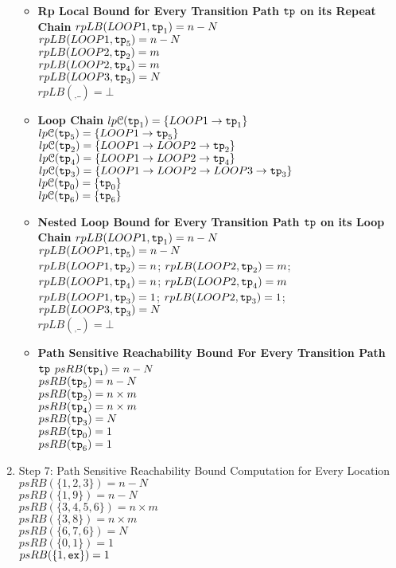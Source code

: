 \begin{enumerate}
\begin{itemize}
    \item \textbf{Rp Local Bound for Every Transition Path $\mathtt{tp}$ on its Repeat Chain}
    $rpLB(LOOP1, \mathtt{tp}_1) = n - N$ \\
    $rpLB(LOOP1, \mathtt{tp}_5) = n - N$ \\
    $rpLB(LOOP2, \mathtt{tp}_2) = m$ \\
    $rpLB(LOOP2, \mathtt{tp}_4) = m$ \\
    $rpLB(LOOP3, \mathtt{tp}_3) = N$ \\
    $rpLB(_, \_) = \bot $ 
    \item \textbf{Loop Chain}
    $lp\mathcal{C}(\mathtt{tp}_1) = \{LOOP1\to \mathtt{tp}_1\}$ \\
    $lp\mathcal{C}(\mathtt{tp}_5) = \{LOOP1\to \mathtt{tp}_5\}$ \\
    $lp\mathcal{C}(\mathtt{tp}_2) = \{LOOP1 \to LOOP2 \to \mathtt{tp}_2\}$ \\
    $lp\mathcal{C}(\mathtt{tp}_4) = \{LOOP1 \to LOOP2 \to \mathtt{tp}_4\}$ \\
    $lp\mathcal{C}(\mathtt{tp}_3) = \{LOOP1 \to LOOP2 \to LOOP3 \to \mathtt{tp}_3\}$ \\
    $lp\mathcal{C}(\mathtt{tp}_0) = \{\mathtt{tp}_0\}$ \\
    $lp\mathcal{C}(\mathtt{tp}_6) = \{\mathtt{tp}_6\}$ 
    \item \textbf{Nested Loop Bound for Every Transition Path $\mathtt{tp}$ on its Loop Chain}
    $rpLB(LOOP1, \mathtt{tp}_1) = n - N$ \\
    $rpLB(LOOP1, \mathtt{tp}_5) = n - N$ \\
    $rpLB(LOOP1, \mathtt{tp}_2) = n$;  $rpLB(LOOP2, \mathtt{tp}_2) = m$; \\
    $rpLB(LOOP1, \mathtt{tp}_4) = n$; $rpLB(LOOP2, \mathtt{tp}_4) = m$ \\
    $rpLB(LOOP1, \mathtt{tp}_3) = 1$; $rpLB(LOOP2, \mathtt{tp}_3) = 1$; $rpLB(LOOP3, \mathtt{tp}_3) = N$ \\
    $rpLB(_, \_) = \bot $ 
    \item \textbf{Path Sensitive Reachability Bound For Every Transition Path $\mathtt{tp}$ }
    $psRB(\mathtt{tp}_1) = n - N$ \\
    $psRB(\mathtt{tp}_5) = n - N$ \\
    $psRB(\mathtt{tp}_2) = n \times m$ \\
    $psRB(\mathtt{tp}_4) = n \times m$ \\
    $psRB(\mathtt{tp}_3) = N$ \\
    $psRB(\mathtt{tp}_0) = 1$ \\
    $psRB(\mathtt{tp}_6) = 1$ 
\end{itemize}
\item Step 7: Path Sensitive Reachability Bound Computation for Every Location
$psRB(\{1, 2, 3\}) = n - N$ \\
$psRB(\{1, 9\}) = n - N$ \\
$psRB(\{3, 4, 5, 6\}) = n \times m$ \\
$psRB(\{3, 8\}) = n \times m$ \\
$psRB(\{6, 7, 6\}) = N$ \\
$psRB(\{0, 1\}) = 1$ \\
$psRB(\{1, \mathtt{ex}\}) = 1$ 
\end{enumerate}